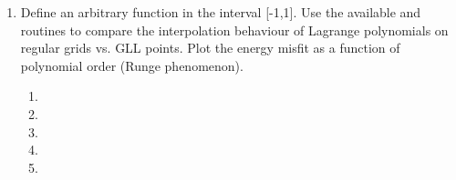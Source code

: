\begin{enumerate}
\begin{enumerate}
\item[]
\item[]
\item[] 
\item[]
\item[] 
\end{enumerate}
\item
Define an arbitrary function in the interval [-1,1]. Use the  available {} and {} routines to compare the interpolation behaviour of Lagrange polynomials on regular grids vs. GLL points. Plot the energy misfit as a function of polynomial order (Runge phenomenon). 
\begin{enumerate}
\item[]
\item[]
\item[] 
\item[]
\item[] 
\end{enumerate}
\end{enumerate}